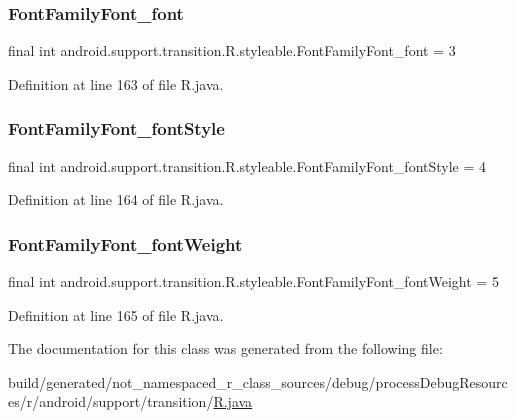 \subsubsection{\texorpdfstring{FontFamilyFont\_font}{FontFamilyFont\_font}}
{\footnotesize\ttfamily final int android.\+support.\+transition.\+R.\+styleable.\+Font\+Family\+Font\+\_\+font = 3\hspace{0.3cm}{\ttfamily [static]}}



Definition at line 163 of file R.\+java.

\mbox{\label{classandroid_1_1support_1_1transition_1_1_r_1_1styleable_aa596a29b204cadfcf4894041bb877a46}} 
\subsubsection{\texorpdfstring{FontFamilyFont\_fontStyle}{FontFamilyFont\_fontStyle}}
{\footnotesize\ttfamily final int android.\+support.\+transition.\+R.\+styleable.\+Font\+Family\+Font\+\_\+font\+Style = 4\hspace{0.3cm}{\ttfamily [static]}}



Definition at line 164 of file R.\+java.

\mbox{\label{classandroid_1_1support_1_1transition_1_1_r_1_1styleable_ac169fcd6c0a602cbbc9306606e16ab9a}} 
\subsubsection{\texorpdfstring{FontFamilyFont\_fontWeight}{FontFamilyFont\_fontWeight}}
{\footnotesize\ttfamily final int android.\+support.\+transition.\+R.\+styleable.\+Font\+Family\+Font\+\_\+font\+Weight = 5\hspace{0.3cm}{\ttfamily [static]}}



Definition at line 165 of file R.\+java.



The documentation for this class was generated from the following file\+:\begin{DoxyCompactItemize}
\item 
build/generated/not\+\_\+namespaced\+\_\+r\+\_\+class\+\_\+sources/debug/process\+Debug\+Resources/r/android/support/transition/\mbox{\hyperlink{android_2support_2transition_2_r_8java}{R.\+java}}\end{DoxyCompactItemize}
